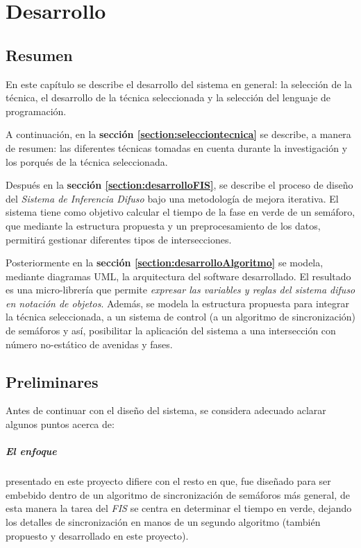\chapter{Desarrollo}
\section{Resumen}
En este capítulo se describe el desarrollo del sistema en general: la selección de la técnica, el desarrollo de la técnica seleccionada y la selección del lenguaje de programación.

A continuación, en la \textbf{sección \ref{section:selecciontecnica}} se describe, a manera de resumen: las diferentes técnicas tomadas en cuenta durante la investigación y los porqués de la técnica seleccionada.

Después en la \textbf{sección \ref{section:desarrolloFIS}}, se describe el proceso de diseño del \textit{Sistema de Inferencia Difuso} bajo una metodología de mejora iterativa. El sistema tiene como objetivo calcular el tiempo de la fase en verde de un semáforo, que mediante la estructura propuesta y un preprocesamiento de los datos, permitirá gestionar diferentes tipos de intersecciones.

Posteriormente en la \textbf{sección \ref{section:desarrolloAlgoritmo}} se modela, mediante diagramas UML, la arquitectura del software desarrollado. El resultado es una micro-librería que permite \emph{expresar las variables y reglas del sistema difuso en notación de objetos}. Además, se modela la estructura propuesta para integrar la técnica seleccionada, a un sistema de control (a un algoritmo de sincronización) de semáforos y así, posibilitar la aplicación del sistema a una intersección con número no-estático de avenidas y fases.

\section{Preliminares}
Antes de continuar con el diseño del sistema, se considera adecuado aclarar algunos puntos acerca de:

\paragraph{El enfoque}presentado en este proyecto difiere con el resto en que, fue diseñado para ser embebido dentro de un algoritmo de sincronización de semáforos más general, de esta manera la tarea del \textit{FIS} se centra en determinar el tiempo en verde, dejando los detalles de sincronización en manos de un segundo algoritmo (también propuesto y desarrollado en este proyecto).

